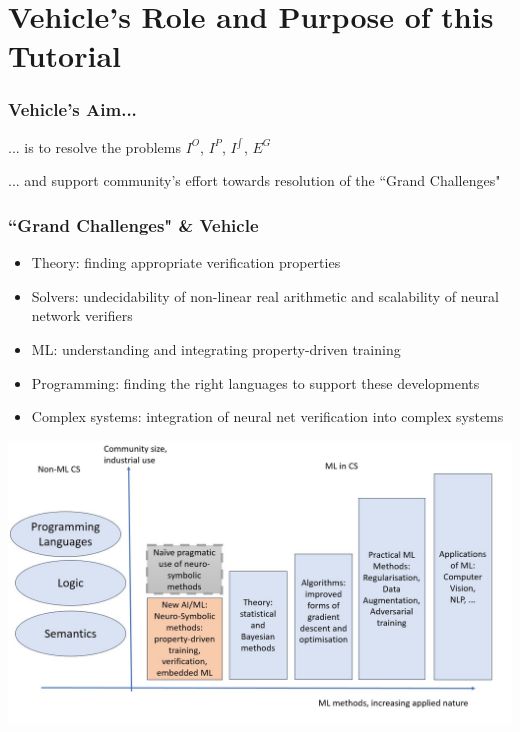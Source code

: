 \documentclass[aspectratio=169]{beamer}
\begin{document}
\section{\textbf{Vehicle}'s Role and Purpose of this Tutorial}

\begin{frame}
\frametitle{\textbf{Vehicle}'s Aim...}

\alert{... is to resolve the problems $I^O$, $I^P$, $I^{\int}$, $E^G$}
\pause

... and support community's effort towards resolution of the ``Grand Challenges"

\end{frame}

  \begin{frame}
  \frametitle{``Grand Challenges"  \& \textbf{Vehicle}}
  \footnotesize{
  \begin{itemize}
  \item Theory: finding appropriate verification properties
\item  Solvers: undecidability of non-linear real arithmetic  and scalability of neural network verifiers
\item \alert{ML: understanding and integrating property-driven training}
\item \alert{Programming: finding the right languages to support these developments}
\item \alert{Complex systems: integration of neural net verification into complex systems}
  \end{itemize}}

  \begin{center}
  \includegraphics[scale=.20]{Images/Slide1.jpg}
  \end{center}
\end{frame}
\end{document}
